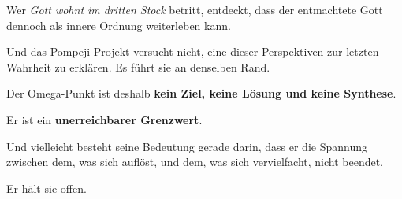 \documentclass[
  ngerman,
]{article}
\begin{document}
Wer \emph{Gott wohnt im dritten Stock} betritt, entdeckt, dass der
entmachtete Gott dennoch als innere Ordnung weiterleben kann.

Und das Pompeji-Projekt versucht nicht, eine dieser Perspektiven zur
letzten Wahrheit zu erklären. Es führt sie an denselben Rand.

Der Omega-Punkt ist deshalb \textbf{kein Ziel, keine Lösung und keine
Synthese}.

Er ist ein \textbf{unerreichbarer Grenzwert}.

Und vielleicht besteht seine Bedeutung gerade darin, dass er die
Spannung zwischen dem, was sich auflöst, und dem, was sich vervielfacht,
nicht beendet.

Er hält sie offen.
\end{document}

